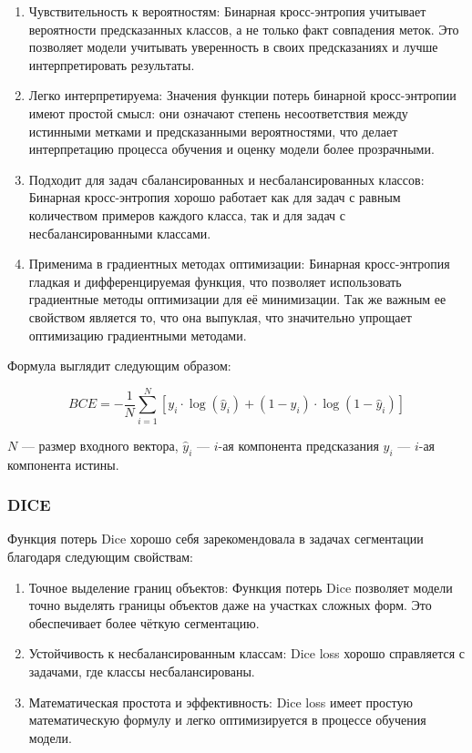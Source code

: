 \begin{enumerate}
	\item Чувствительность к вероятностям: Бинарная кросс-энтропия учитывает
	вероятности предсказанных классов, а не только факт совпадения меток. Это
	позволяет модели учитывать уверенность в своих предсказаниях и лучше
	интерпретировать результаты.

	\item Легко интерпретируема: Значения функции потерь бинарной
	кросс-энтропии имеют простой смысл: они означают степень несоответствия
	между истинными метками и предсказанными вероятностями, что делает
	интерпретацию процесса обучения и оценку модели более прозрачными.

	\item Подходит для задач сбалансированных и несбалансированных классов:
	Бинарная кросс-энтропия хорошо работает как для задач с равным количеством
	примеров каждого класса, так и для задач с несбалансированными классами.

	\item Применима в градиентных методах оптимизации: Бинарная кросс-энтропия
	гладкая и дифференцируемая функция, что позволяет использовать градиентные
	методы оптимизации для её минимизации. Так же важным ее свойством является
	то, что она выпуклая, что значительно упрощает оптимизацию градиентными
	методами.


\end{enumerate}

Формула выглядит следующим образом:

\begin{equation}
	BCE = - \frac{1}{N} \sum_{i=1}^{N} \left[ y_i \cdot \log(\hat{y}_i) + (1 - y_i)
		\cdot \log(1 - \hat{y}_i) \right]
	\label{eq:bce}
\end{equation}

\noindent $N$ --- размер входного вектора, $\hat{y}_i$ --- $i$-ая компонента предсказания
$y_i$ --- $i$-ая компонента истины.


\subsubsection{DICE}

Функция потерь Dice хорошо себя зарекомендовала в задачах сегментации благодаря
следующим свойствам:

\begin{enumerate}

	\item Точное выделение границ объектов: Функция потерь Dice позволяет
	модели точно выделять границы объектов даже на участках сложных форм. Это
	обеспечивает более чёткую сегментацию.

	\item Устойчивость к несбалансированным классам: Dice loss хорошо
	справляется с задачами, где классы несбалансированы.

	\item Математическая простота и эффективность: Dice loss имеет простую
	математическую формулу и легко оптимизируется в процессе обучения модели.

\end{enumerate}

